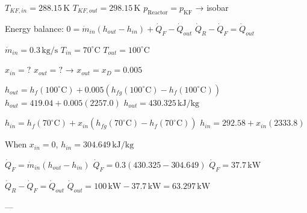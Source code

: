 \( T_{KF,in} = 288.15 \, \text{K} \)  
\( T_{KF,out} = 298.15 \, \text{K} \)  
\( p_{\text{Reactor}} = p_{\text{KF}} \) → isobar  

Energy balance:  
\( 0 = \dot{m}_{in} (h_{out} - h_{in}) + \dot{Q}_F - \dot{Q}_{out} \)  
\( \dot{Q}_R - \dot{Q}_F = \dot{Q}_{out} \)  

\( \dot{m}_{in} = 0.3 \, \text{kg/s} \)  
\( T_{in} = 70^\circ \text{C} \)  
\( T_{out} = 100^\circ \text{C} \)  

\( x_{in} = ? \)  
\( x_{out} = ? \) → \( x_{out} = x_D = 0.005 \)  

\( h_{out} = h_f(100^\circ \text{C}) + 0.005 (h_{fg}(100^\circ \text{C}) - h_f(100^\circ \text{C})) \)  
\( h_{out} = 419.04 + 0.005 (2257.0) \)  
\( h_{out} = 430.325 \, \text{kJ/kg} \)  

\( h_{in} = h_f(70^\circ \text{C}) + x_{in} (h_{fg}(70^\circ \text{C}) - h_f(70^\circ \text{C})) \)  
\( h_{in} = 292.58 + x_{in} (2333.8) \)  

When \( x_{in} = 0 \), \( h_{in} = 304.649 \, \text{kJ/kg} \)  

\( \dot{Q}_F = \dot{m}_{in} (h_{out} - h_{in}) \)  
\( \dot{Q}_F = 0.3 (430.325 - 304.649) \)  
\( \dot{Q}_F = 37.7 \, \text{kW} \)  

\( \dot{Q}_R - \dot{Q}_F = \dot{Q}_{out} \)  
\( \dot{Q}_{out} = 100 \, \text{kW} - 37.7 \, \text{kW} = 63.297 \, \text{kW} \)  

---